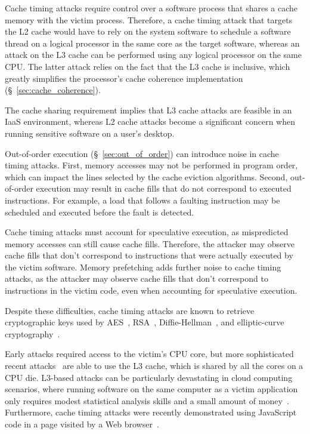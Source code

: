 
Cache timing attacks require control over a software process that shares a
cache memory with the victim process. Therefore, a cache timing attack that
targets the L2 cache would have to rely on the system software to schedule a
software thread on a logical processor in the same core as the target software,
whereas an attack on the L3 cache can be performed using any logical processor
on the same CPU. The latter attack relies on the fact that the L3 cache is
inclusive, which greatly simplifies the processor's cache coherence
implementation (\S~\ref{sec:cache_coherence}).

The cache sharing requirement implies that L3 cache attacks are feasible in an
IaaS environment, whereas L2 cache attacks become a significant concern when
running sensitive software on a user's desktop.

Out-of-order execution (\S~\ref{sec:out_of_order}) can introduce noise in cache
timing attacks. First, memory accesses may not be performed in program order,
which can impact the lines selected by the cache eviction algorithms. Second,
out-of-order execution may result in cache fills that do not correspond to
executed instructions. For example, a load that follows a faulting instruction
may be scheduled and executed before the fault is detected.

Cache timing attacks must account for speculative execution, as mispredicted
memory accesses can still cause cache fills. Therefore, the attacker may
observe cache fills that don't correspond to instructions that were actually
executed by the victim software. Memory prefetching adds further noise to cache
timing attacks, as the attacker may observe cache fills that don't correspond
to instructions in the victim code, even when accounting for speculative
execution.



Despite these difficulties, cache timing attacks are known to retrieve
cryptographic keys used by AES~\cite{osvik2006aes, bonneau2006aes},
RSA~\cite{brumley2005rsa}, Diffie-Hellman~\cite{kocher1996timing}, and
elliptic-curve cryptography~\cite{brumley2011ecc}.

Early attacks required access to the victim's CPU core, but more sophisticated
recent attacks~\cite{yarom2013llctiming, liu2015llctiming} are able to use the
L3 cache, which is shared by all the cores on a CPU die. L3-based attacks can
be particularly devastating in cloud computing scenarios, where running
software on the same computer as a victim application only requires modest
statistical analysis skills and a small amount of
money~\cite{ristenpart2009colocation}. Furthermore, cache timing attacks were
recently demonstrated using JavaScript code in a page visited by a Web
browser~\cite{oren2015jstiming}.

